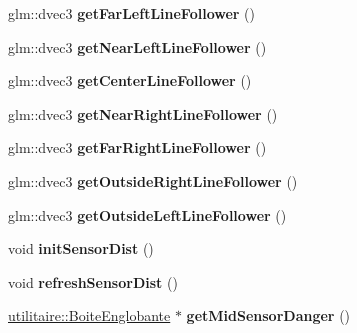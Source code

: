 \begin{DoxyCompactItemize}
\item 
\hypertarget{class_noeud_robot_a613cdb2bb2f049e5dc5b055fd2f35c0f}{glm\-::dvec3 {\bfseries get\-Far\-Left\-Line\-Follower} ()}\label{class_noeud_robot_a613cdb2bb2f049e5dc5b055fd2f35c0f}

\item 
\hypertarget{class_noeud_robot_a1f1328c1a6aeb64f1081450bc00a655b}{glm\-::dvec3 {\bfseries get\-Near\-Left\-Line\-Follower} ()}\label{class_noeud_robot_a1f1328c1a6aeb64f1081450bc00a655b}

\item 
\hypertarget{class_noeud_robot_ae6dda37a4de0925a2de01c0f37c0d095}{glm\-::dvec3 {\bfseries get\-Center\-Line\-Follower} ()}\label{class_noeud_robot_ae6dda37a4de0925a2de01c0f37c0d095}

\item 
\hypertarget{class_noeud_robot_aba2c676844bd16a00a1218bea8ea2b49}{glm\-::dvec3 {\bfseries get\-Near\-Right\-Line\-Follower} ()}\label{class_noeud_robot_aba2c676844bd16a00a1218bea8ea2b49}

\item 
\hypertarget{class_noeud_robot_a73c9a5b16232001210f40e1417de26e9}{glm\-::dvec3 {\bfseries get\-Far\-Right\-Line\-Follower} ()}\label{class_noeud_robot_a73c9a5b16232001210f40e1417de26e9}

\item 
\hypertarget{class_noeud_robot_a42d7455c744a45dc1b108e87918d796f}{glm\-::dvec3 {\bfseries get\-Outside\-Right\-Line\-Follower} ()}\label{class_noeud_robot_a42d7455c744a45dc1b108e87918d796f}

\item 
\hypertarget{class_noeud_robot_a1247f53d299f3cf0b4f1edac7c781253}{glm\-::dvec3 {\bfseries get\-Outside\-Left\-Line\-Follower} ()}\label{class_noeud_robot_a1247f53d299f3cf0b4f1edac7c781253}

\item 
\hypertarget{group__inf2990_ga80efd494c54af60ce2597e1819c8dea4}{void {\bfseries init\-Sensor\-Dist} ()}\label{group__inf2990_ga80efd494c54af60ce2597e1819c8dea4}

\item 
\hypertarget{group__inf2990_ga53f132a7876b353dd8a46164f6e19135}{void {\bfseries refresh\-Sensor\-Dist} ()}\label{group__inf2990_ga53f132a7876b353dd8a46164f6e19135}

\item 
\hypertarget{class_noeud_robot_af9cf290fd1186d2cd48795fac69dcb7a}{\hyperlink{structutilitaire_1_1_boite_englobante}{utilitaire\-::\-Boite\-Englobante} $\ast$ {\bfseries get\-Mid\-Sensor\-Danger} ()}\label{class_noeud_robot_af9cf290fd1186d2cd48795fac69dcb7a}


\end{DoxyCompactItemize}
